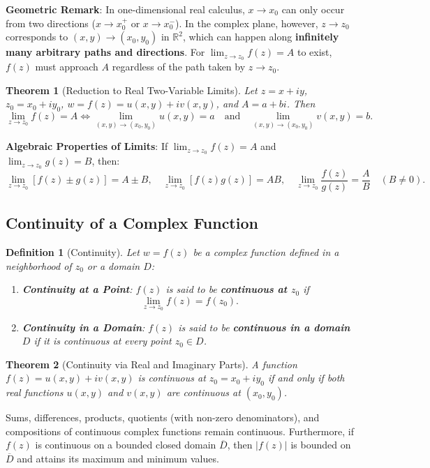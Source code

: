 \documentclass[11pt,a4paper]{article}
\theoremstyle{definitionbreak}
\newtheorem{definition}{Definition}
\theoremstyle{examplebreak}
\theoremstyle{theorembreak}
\newtheorem{theorem}{Theorem}
\begin{document}
\textbf{Geometric Remark}: In one-dimensional real calculus, $x \to x_0$ can only occur from two directions ($x \to x_0^+$ or $x \to x_0^-$). In the complex plane, however, $z \to z_0$ corresponds to $(x, y) \to (x_0, y_0)$ in $\mathbb{R}^2$, which can happen along \textbf{infinitely many arbitrary paths and directions}. For $\lim_{z \to z_0} f(z) = A$ to exist, $f(z)$ must approach $A$ regardless of the path taken by $z \to z_0$.

\begin{theorem}[Reduction to Real Two-Variable Limits]
Let $z = x + iy$, $z_0 = x_0 + iy_0$, $w = f(z) = u(x, y) + iv(x, y)$, and $A = a + bi$. Then
\[
    \lim_{z \to z_0} f(z) = A \iff \lim_{(x,y) \to (x_0,y_0)} u(x, y) = a \quad \text{and} \quad \lim_{(x,y) \to (x_0,y_0)} v(x, y) = b.
\]
\end{theorem}

\textbf{Algebraic Properties of Limits}: If $\lim_{z \to z_0} f(z) = A$ and $\lim_{z \to z_0} g(z) = B$, then:
\[
    \lim_{z \to z_0} [f(z) \pm g(z)] = A \pm B, \quad \lim_{z \to z_0} [f(z)g(z)] = AB, \quad \lim_{z \to z_0} \frac{f(z)}{g(z)} = \frac{A}{B} \quad (B \neq 0).
\]

\subsection{Continuity of a Complex Function}

\begin{definition}[Continuity]
Let $w = f(z)$ be a complex function defined in a neighborhood of $z_0$ or a domain $D$:
\begin{enumerate}
    \item \textbf{Continuity at a Point}: $f(z)$ is said to be \textbf{continuous at $z_0$} if
    \[
        \lim_{z \to z_0} f(z) = f(z_0).
    \]
    \item \textbf{Continuity in a Domain}: $f(z)$ is said to be \textbf{continuous in a domain $D$} if it is continuous at every point $z_0 \in D$.
\end{enumerate}
\end{definition}

\begin{theorem}[Continuity via Real and Imaginary Parts]
A function $f(z) = u(x, y) + iv(x, y)$ is continuous at $z_0 = x_0 + iy_0$ if and only if both real functions $u(x, y)$ and $v(x, y)$ are continuous at $(x_0, y_0)$.
\end{theorem}

Sums, differences, products, quotients (with non-zero denominators), and compositions of continuous complex functions remain continuous. Furthermore, if $f(z)$ is continuous on a bounded closed domain $\overline{D}$, then $|f(z)|$ is bounded on $\overline{D}$ and attains its maximum and minimum values.
\end{document}
